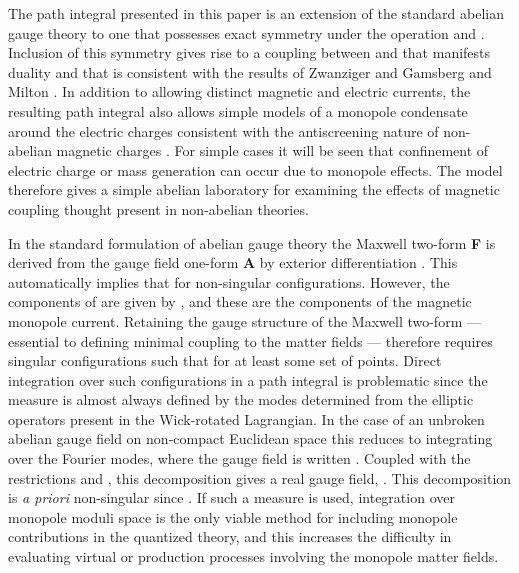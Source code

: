 \documentclass[a4paper,a4paper]{article}
\begin{document}
The path integral presented in this paper is an extension of the standard abelian gauge theory  to one that possesses exact symmetry under the operation \coordHE{} and \coordHE{}.  Inclusion of this symmetry gives rise to a coupling between \myHighlight{$\jmath$}\coordHE{} and \coordHE{} that manifests duality and that is consistent with the results of Zwanziger \cite{Zwanziger} and Gamsberg and Milton \cite{GamsbergMilton}. In addition to allowing distinct magnetic and electric currents, the resulting path integral also allows simple models of a  monopole condensate around the electric charges consistent with the antiscreening nature of non-abelian magnetic charges \cite{Goebel}. For simple cases it will be seen that confinement of electric charge or mass generation can occur due to monopole effects. The model therefore gives a simple abelian laboratory for examining the effects of magnetic coupling thought present in non-abelian theories.

In the standard formulation of abelian gauge theory the Maxwell two-form {\bf F} is derived from the gauge field one-form {\bf A} by exterior differentiation \coordHE{}.  This automatically implies  that \coordHE{} for non-singular configurations.  However, the components of \coordHE{} are given by \coordHE{}, and these are the components of the magnetic monopole current.  Retaining the gauge structure of the Maxwell two-form --- essential to defining minimal coupling to the matter fields --- therefore requires singular configurations such that \coordHE{} for at least some set of points.  Direct integration over such configurations in a path integral is problematic since the measure is almost always defined by the modes determined from the elliptic operators present in the Wick-rotated Lagrangian.  In the case of an unbroken abelian gauge field on non-compact Euclidean space this reduces to integrating over the Fourier modes, where the gauge field \coordHE{} is written \coordHE{}.  Coupled with the restrictions \coordHE{} and \coordHE{}, this decomposition gives a real gauge field, \coordHE{}. This decomposition is {\it a priori} non-singular since \coordHE{}. If such a measure is used, integration over monopole moduli space is the only viable method for including monopole contributions in the quantized theory, and this increases the difficulty in evaluating virtual or production processes involving the monopole matter fields.  
\end{document}
